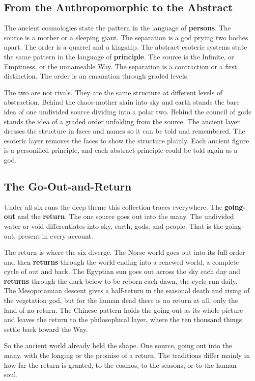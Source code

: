 \subsection{From the Anthropomorphic to the Abstract}

The ancient cosmologies state the pattern in the language of \textbf{persons}. The source is a mother or a sleeping giant. The separation is a god prying two bodies apart. The order is a quarrel and a kingship. The abstract esoteric systems state the same pattern in the language of \textbf{principle}. The source is the Infinite, or Emptiness, or the unnameable Way. The separation is a contraction or a first distinction. The order is an emanation through graded levels.

The two are not rivals. They are the same structure at different levels of abstraction. Behind the chaos-mother slain into sky and earth stands the bare idea of one undivided source dividing into a polar two. Behind the council of gods stands the idea of a graded order unfolding from the source. The ancient layer dresses the structure in faces and names so it can be told and remembered. The esoteric layer removes the faces to show the structure plainly. Each ancient figure is a personified principle, and each abstract principle could be told again as a god.

\subsection{The Go-Out-and-Return}

Under all six runs the deep theme this collection traces everywhere. The \textbf{going-out} and the \textbf{return}. The one source goes out into the many. The undivided water or void differentiates into sky, earth, gods, and people. That is the going-out, present in every account.

The return is where the six diverge. The Norse world goes out into its full order and then \textbf{returns} through the world-ending into a renewed world, a complete cycle of out and back. The Egyptian sun goes out across the sky each day and \textbf{returns} through the dark below to be reborn each dawn, the cycle run daily. The Mesopotamian descent gives a half-return in the seasonal death and rising of the vegetation god, but for the human dead there is no return at all, only the land of no return. The Chinese pattern holds the going-out as its whole picture and leaves the return to the philosophical layer, where the ten thousand things settle back toward the Way.

So the ancient world already held the shape. One source, going out into the many, with the longing or the promise of a return. The traditions differ mainly in how far the return is granted, to the cosmos, to the seasons, or to the human soul.
